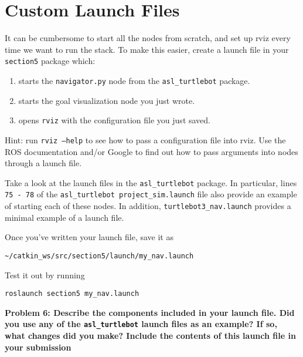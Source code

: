 \documentclass{article}
\begin{document}
\section{Custom Launch Files}
It can be cumbersome to start all the nodes from scratch, and set up rviz every time we want to run the stack. To make this easier, create a launch file in your \texttt{section5} package which:
\begin{enumerate}
    \item starts the \texttt{navigator.py} node from the \texttt{asl\_turtlebot} package.
    \item starts the goal visualization node you just wrote.
    \item opens \texttt{rviz} with the configuration file you just saved.
\end{enumerate}

Hint: run \texttt{rviz --help} to see how to pass a configuration file into rviz.
Use the ROS documentation and/or Google to find out how to pass arguments into nodes through a launch file.

Take a look at the launch files in the \texttt{asl\_turtlebot} package. In particular, lines \texttt{75 - 78} of the \texttt{asl\_turtlebot project\_sim.launch} file also provide an example of starting each of these nodes. In addition, \texttt{turtlebot3\_nav.launch} provides a minimal example of a launch file.

Once you've written your launch file, save it as


\begin{lstlisting}
~/catkin_ws/src/section5/launch/my_nav.launch
\end{lstlisting}


Test it out by running


\begin{lstlisting}
roslaunch section5 my_nav.launch
\end{lstlisting}


\textbf{Problem 6: Describe the components included in your launch file. Did you use any of the \texttt{asl\_turtlebot} launch files as an example? If so, what changes did you make? Include the contents of this launch file in your submission}
\end{document}
